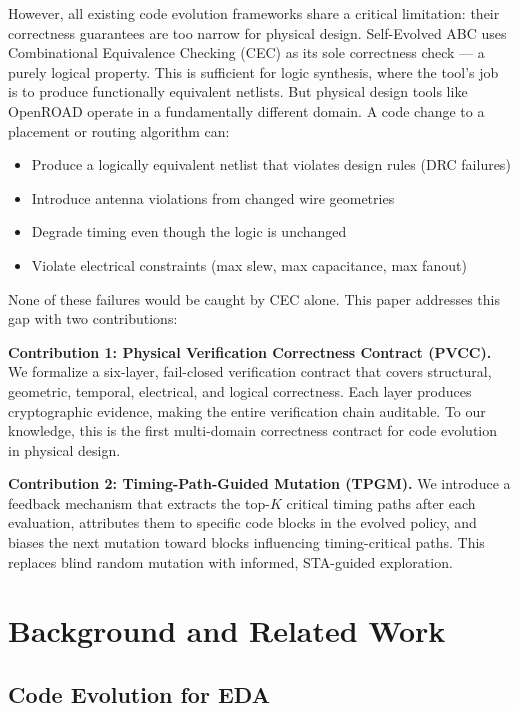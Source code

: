 \documentclass[conference]{IEEEtran}
\begin{document}
However, all existing code evolution frameworks share a critical limitation: their correctness guarantees are too narrow for physical design. Self-Evolved ABC uses Combinational Equivalence Checking (CEC) as its sole correctness check --- a purely logical property. This is sufficient for logic synthesis, where the tool's job is to produce functionally equivalent netlists. But physical design tools like OpenROAD operate in a fundamentally different domain. A code change to a placement or routing algorithm can:

\begin{itemize}
\item Produce a logically equivalent netlist that violates design rules (DRC failures)
\item Introduce antenna violations from changed wire geometries
\item Degrade timing even though the logic is unchanged
\item Violate electrical constraints (max slew, max capacitance, max fanout)
\end{itemize}

None of these failures would be caught by CEC alone. This paper addresses this gap with two contributions:

\textbf{Contribution 1: Physical Verification Correctness Contract (PVCC).} We formalize a six-layer, fail-closed verification contract that covers structural, geometric, temporal, electrical, and logical correctness. Each layer produces cryptographic evidence, making the entire verification chain auditable. To our knowledge, this is the first multi-domain correctness contract for code evolution in physical design.

\textbf{Contribution 2: Timing-Path-Guided Mutation (TPGM).} We introduce a feedback mechanism that extracts the top-$K$ critical timing paths after each evaluation, attributes them to specific code blocks in the evolved policy, and biases the next mutation toward blocks influencing timing-critical paths. This replaces blind random mutation with informed, STA-guided exploration.

\section{Background and Related Work}

\subsection{Code Evolution for EDA}
\end{document}

